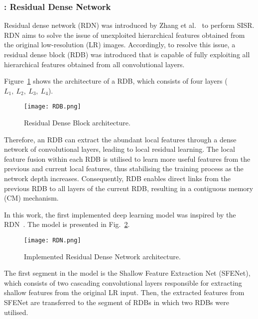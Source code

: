 \subsubsection{\DIFdelbegin {}\DIFdelend \DIFaddbegin {}\DIFaddend : Residual Dense Network}

Residual dense network (RDN) was introduced by Zhang et al.~\cite{Zhang2018} to perform SISR.
RDN aims to solve the issue of unexploited hierarchical features obtained from the original low-resolution (LR) images.
Accordingly, to resolve this issue, a residual dense block (RDB) was introduced that is capable of fully exploiting all hierarchical features obtained from all convolutional layers.

Figure~\ref{fig:RDB} shows the architecture of a RDB, which consists of four layers (\(L_1,\ L_2,\ L_3,\ L_4\)).
\begin{figure} [h!]
	\begin{center}
		\texttt{[image: RDB.png]}
	\end{center}
	\caption{Residual Dense Block architecture.} 
	\label{fig:RDB}
\end{figure}
Therefore, an RDB can extract the abundant local features through a dense network of convolutional layers, leading to local residual learning.
The local feature fusion within each RDB is utilised to learn more useful features from the previous and current local features, thus stabilising the training process as the network depth increases.
Consequently, RDB enables direct links from the previous RDB to all layers of the current RDB, resulting in a contiguous memory (CM) mechanism.

In this work, the first implemented deep learning model was inspired by the RDN~\cite{Zhang2018}. 
The model is presented in Fig.~\ref{fig:RDN}.
\begin{figure} [h!]
	\begin{center}
		\texttt{[image: RDN.png]}
	\end{center}
	\caption{Implemented Residual Dense Network architecture.} 
	\label{fig:RDN}
\end{figure}
The first segment in the model is the Shallow Feature Extraction Net (SFENet), which consists of two cascading convolutional layers responsible for extracting shallow features from the original LR input.
Then, the extracted features from SFENet are transferred to the segment of RDBs in which two RDBs were utilised.

